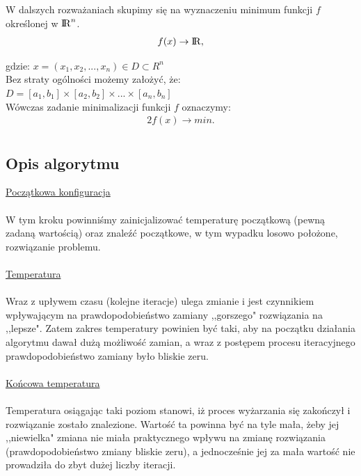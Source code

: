 \documentclass[twoside]{projektInzynierskiMS1}
\newcommand{\newLine}{~\\}
\newcommand{\si}{ś}
\begin{document}
W dalszych rozważaniach skupimy się na wyznaczeniu minimum funkcji $f$ okre\si lonej w ${\rm I\!R}^n$.
\begin{alignat*}{2}
f(x) \rightarrow {\rm I\!R}, 
\end{alignat*}

\noindent gdzie: $x = (x_1, x_2, ..., x_n) \in D \subset R^n$ \\

Bez straty ogólno\si ci możemy założyć, że:\\
$D = [a_1, b_1] \times [ a_2, b_2] \times ... \times [a_n, b_n]$ \\

Wówczas zadanie minimalizacji funkcji $f$ oznaczymy:
\begin{alignat*}{2}
f(x) \rightarrow min. \\
\end{alignat*}


		\subsection{Opis algorytmu}
		
\noindent \underline{Początkowa konfiguracja} \\ \newLine
\indent W tym kroku powinniśmy zainicjalizować temperaturę początkową (pewną zadaną warto\si cią) oraz znaleźć początkowe, w tym wypadku losowo położone, rozwiązanie problemu. 
\\ \newLine

\noindent \underline{Temperatura} \\ \newLine
\indent  Wraz z upływem czasu (kolejne iteracje) ulega zmianie i jest czynnikiem wpływającym na prawdopodobieństwo zamiany ,,gorszego" rozwiązania na ,,lepsze". Zatem zakres temperatury powinien być taki, aby na początku działania algorytmu dawał dużą możliwość zamian, a wraz z postępem procesu iteracyjnego prawdopodobieństwo zamiany było bliskie zeru.\\ \newLine

\noindent \underline{Końcowa temperatura} \\ \newLine
\indent Temperatura osiągając taki poziom stanowi, iż proces wyżarzania się zakończył i rozwiązanie zostało znalezione.
Wartość ta powinna być na tyle mała, żeby jej ,,niewielka" zmiana nie miała praktycznego wpływu na zmianę rozwiązania (prawdopodobieństwo zmiany bliskie zeru), a jednocze\si nie jej za mała warto\si ć nie prowadziła do zbyt dużej liczby iteracji. \\ \newLine
\end{document}
